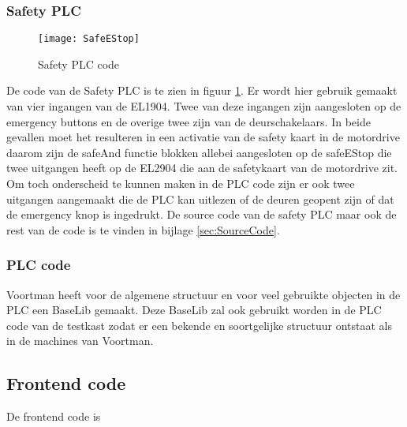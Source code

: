 \subsubsection{Safety \gls{PLC}}

\begin{figure}[H]
	\centering
	\texttt{[image: SafeEStop]}
	\caption{Safety \gls{PLC} code}
	\label{fig:SafetyPLC}
\end{figure}

De code van de Safety \gls{PLC} is te zien in figuur \ref{fig:SafetyPLC}. Er wordt hier gebruik gemaakt van vier ingangen van de EL1904. Twee van deze ingangen zijn aangesloten op de emergency buttons en de overige twee zijn van de deurschakelaars. In beide gevallen moet het resulteren in een activatie van de safety kaart in de motordrive daarom zijn de safeAnd functie blokken allebei aangesloten op de safeEStop die twee uitgangen heeft op de EL2904 die aan de safetykaart van de motordrive zit. Om toch onderscheid te kunnen maken in de \gls{PLC} code zijn er ook twee uitgangen aangemaakt die de \gls{PLC} kan uitlezen of de deuren geopent zijn of dat de emergency knop is ingedrukt. De source code van de safety \gls{PLC} maar ook de rest van de code is te vinden in bijlage \ref{sec:SourceCode}.

\newpage

\subsubsection{\gls{PLC} code}

Voortman heeft voor de algemene structuur en voor veel gebruikte objecten in de \gls{PLC} een \gls{BaseLib} gemaakt. Deze \gls{BaseLib} zal ook gebruikt worden in de \gls{PLC} code van de testkast zodat er een bekende en soortgelijke structuur ontstaat als in de machines van Voortman. 

\subsection{Frontend code}

De frontend code is 